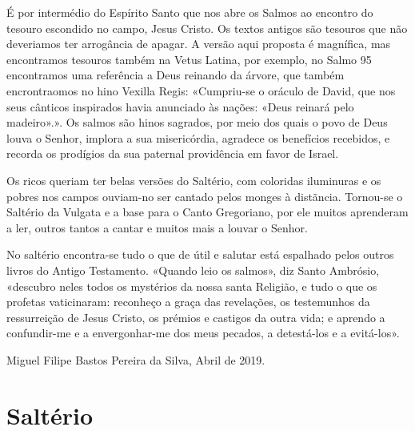 É por intermédio do Espírito Santo que nos abre os Salmos ao encontro do tesouro escondido no campo, Jesus Cristo. Os textos antigos são tesouros que não deveriamos ter arrogância de apagar. A versão aqui proposta é magnífica, mas encontramos tesouros também na Vetus Latina, por exemplo, no Salmo 95 encontramos uma referência a Deus reinando da árvore, que também encrontraomos no hino Vexilla Regis: «Cumpriu-se o oráculo de David, que nos seus cânticos inspirados havia anunciado às nações: «Deus reinará pelo madeiro».». Os salmos são hinos sagrados, por meio dos quais o povo de Deus louva o Senhor, implora a sua misericórdia, agradece os benefícios recebidos, e recorda os prodígios da sua paternal providência em favor de Israel.

Os ricos queriam ter belas versões do Saltério, com coloridas iluminuras e os pobres nos campos ouviam-no ser cantado pelos monges à distãncia. Tornou-se o Saltério da Vulgata e a base para o Canto Gregoriano, por ele muitos aprenderam a ler, outros tantos a cantar e muitos mais a louvar o Senhor.

No saltério encontra-se tudo o que de útil e salutar está espalhado pelos outros livros do Antigo Testamento. «Quando leio os salmos», diz Santo Ambrósio, «descubro neles todos os mystérios da nossa santa Religião, e tudo o que os profetas vaticinaram: reconheço a graça das revelações, os testemunhos da ressurreição de Jesus Cristo, os prémios e castigos da outra vida; e aprendo a confundir-me e a envergonhar-me dos meus pecados, a detestá-los e a evitá-los».

Miguel Filipe Bastos Pereira da Silva, Abril de 2019.

\newpage\null\thispagestyle{empty}\newpage

\section{Saltério}

\label{salmo1}


\label{salmo2}


\label{salmo3}


\label{salmo4}


\label{salmo5}


